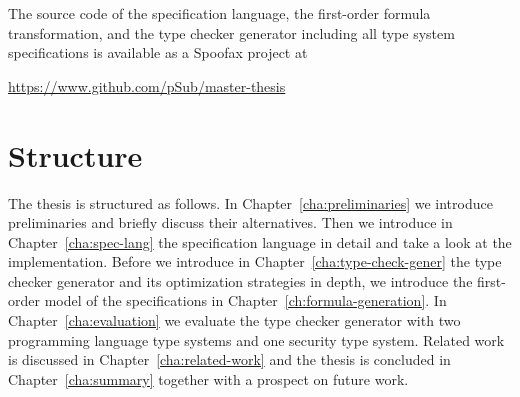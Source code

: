 The source code of the specification language, the first-order formula
transformation, and the type checker generator including all type
system specifications is available as a Spoofax project at
\begin{center}\url{https://www.github.com/pSub/master-thesis}\end{center}

\section{Structure}
The thesis is structured as follows. In
Chapter~\ref{cha:preliminaries} we introduce preliminaries and briefly
discuss their alternatives. Then we introduce in
Chapter~\ref{cha:spec-lang} the specification language in detail and
take a look at the implementation. Before we introduce in
Chapter~\ref{cha:type-check-gener} the type checker generator and its
optimization strategies in depth, we introduce the first-order model
of the specifications in Chapter~\ref{ch:formula-generation}. In
Chapter~\ref{cha:evaluation} we evaluate the type checker generator
with two programming language type systems and one security type
system. Related work is discussed in Chapter~\ref{cha:related-work}
and the thesis is concluded in Chapter~\ref{cha:summary} together with
a prospect on future work.

